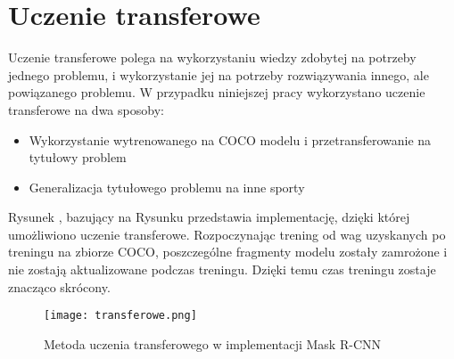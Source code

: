 \newpage
\section{Uczenie transferowe}
\label{sec:uczenie-transferowe}

Uczenie transferowe polega na wykorzystaniu wiedzy zdobytej na potrzeby jednego problemu, i wykorzystanie jej na potrzeby rozwiązywania innego, ale powiązanego problemu.
W przypadku niniejszej pracy wykorzystano uczenie transferowe na dwa sposoby:

\begin{itemize}
	\item Wykorzystanie wytrenowanego na COCO modelu i przetransferowanie na tytułowy problem
	\item Generalizacja tytułowego problemu na inne sporty
\end{itemize}

Rysunek , bazujący na Rysunku  przedstawia implementację, dzięki której umożliwiono uczenie transferowe. Rozpoczynając trening od wag uzyskanych po treningu na zbiorze COCO, poszczególne fragmenty modelu zostały zamrożone i nie zostają aktualizowane podczas treningu. Dzięki temu czas treningu zostaje znacząco skrócony.

\begin{figure}[h]
  \centering
  \caption{Metoda uczenia transferowego w implementacji Mask R-CNN}
  \texttt{[image: transferowe.png]}
  \label{fig:transferowe}
\end{figure}
